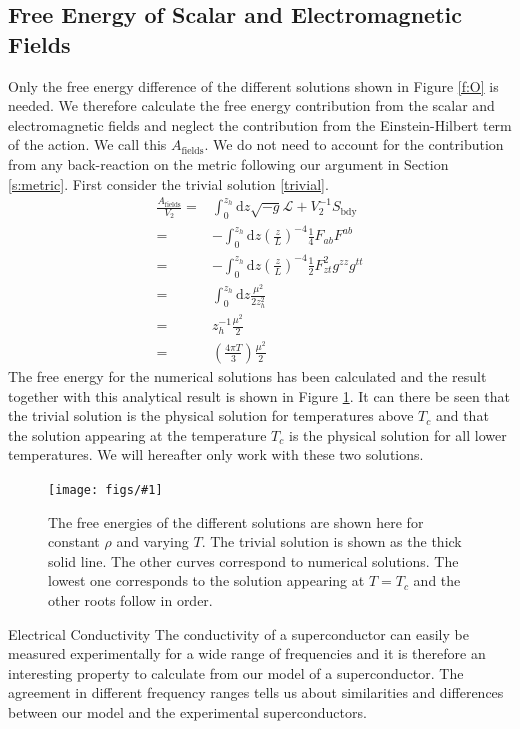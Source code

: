 \documentclass[12pt]{report}
\renewcommand{\d}{\ensuremath{\mathrm{d}}}
\renewcommand{\L}{\ensuremath{\mathcal{L}}}
\newcommand{\fig}[3]{
\begin{figure}
\centering
\texttt{[image: figs/\#1]}
\caption{#2}
\end{figure}
}
\begin{document}
\subsection{Free Energy of Scalar and Electromagnetic Fields}
Only the free energy difference of the different solutions shown in Figure \ref{f:O} is needed. We therefore calculate the free energy contribution from the scalar and electromagnetic fields and neglect the contribution from the Einstein-Hilbert term of the action. We call this $A_\mathrm{fields}$. We do not need to account for the contribution from any back-reaction on the metric following our argument in Section \ref{s:metric}. First consider the trivial solution \eqref{trivial}.
\begin{equation}
\begin{split}
 \frac{A_\mathrm{fields}}{V_\mathrm{2}}=&\int_0^{z_h}\d z \sqrt{-g}\L+V_\mathrm{2}^{-1}S_{\mathrm{bdy}}\\
=&-\int_0^{z_h}\d z \left(\frac{z}{L}\right)^{-4}\frac{1}{4}F_{ab}F^{ab}\\
=&-\int_0^{z_h}\d z \left(\frac{z}{L}\right)^{-4}\frac{1}{2}F_{zt}^2g^{zz}g^{tt}\\
=&\int_0^{z_h}\d z \frac{\mu^2}{2z_h^2}\\
=&z_h^{-1}\frac{\mu^2}{2}\\
=&\left(\frac{4\pi T}{3}\right)\frac{\mu^2}{2}
\end{split}
\end{equation}
The free energy for the numerical solutions has been calculated and the result together with this analytical result is shown in Figure \ref{f:A}. It can there be seen that the trivial solution is the physical solution for temperatures above $T_c$ and that the solution appearing at the temperature $T_c$ is the physical solution for all lower temperatures. We will hereafter only work with these two solutions.

\fig{A_constRho_a2_0.0.pdf}{The free energies of the different solutions are shown here for constant $\rho$ and varying $T$. The trivial solution is shown as the thick solid line. The other curves correspond to numerical solutions. The lowest one corresponds to the solution appearing at $T=T_c$ and the other roots follow in order.\label{f:A}}

\section{Electrical Conductivity}
The conductivity of a superconductor can easily be measured experimentally for a wide range of frequencies and it is therefore an interesting property to calculate from our model of a superconductor. The agreement in different frequency ranges tells us about similarities and differences between our model and the experimental superconductors.\\
\end{document}
